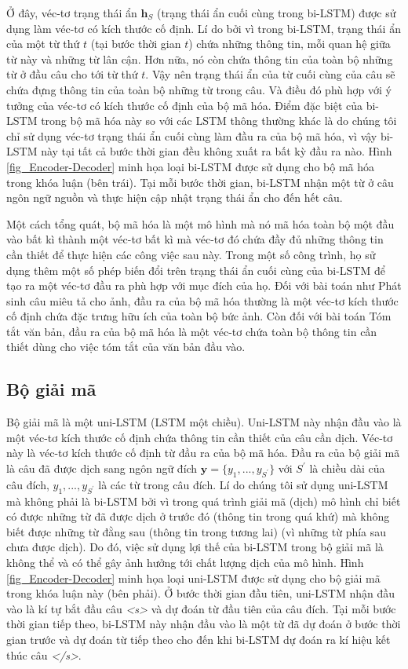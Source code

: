 Ở đây, véc-tơ trạng thái ẩn $\bm{h}_S$ (trạng thái ẩn cuối cùng trong bi-LSTM) được sử dụng làm véc-tơ có kích thước cố định. Lí do bởi vì trong bi-LSTM, trạng thái ẩn của một từ thứ $t$ (tại bước thời gian $t$) chứa những thông tin, mỗi quan hệ giữa từ này và những từ lân cận. Hơn nữa, nó còn chứa thông tin của toàn bộ những từ ở đầu câu cho tới từ thứ $t$. Vậy nên trạng thái ẩn của từ cuối cùng của câu sẽ chứa đựng thông tin của toàn bộ những từ trong câu. Và điều đó phù hợp với ý tưởng của véc-tơ có kích thước cố định của bộ mã hóa. Điểm đặc biệt của bi-LSTM trong bộ mã hóa này so với các LSTM thông thường khác là do chúng tôi chỉ sử dụng véc-tơ trạng thái ẩn cuối cùng làm đầu ra của bộ mã hóa, vì vậy bi-LSTM này tại tất cả bước thời gian đều không xuất ra bất kỳ đầu ra nào. Hình \ref{fig_Encoder-Decoder} minh họa loại bi-LSTM được sử dụng cho bộ mã hóa trong khóa luận (bên trái). Tại mỗi bước thời gian, bi-LSTM nhận một từ ở câu ngôn ngữ nguồn và thực hiện cập nhật trạng thái ẩn cho đến hết câu.

Một cách tổng quát, bộ mã hóa là một mô hình mà nó mã hóa toàn bộ một đầu vào bất kì thành một véc-tơ bất kì mà véc-tơ đó chứa đầy đủ những thông tin cần thiết để thực hiện các công việc sau này. Trong một số công trình, họ sử dụng thêm một số phép biến đổi trên trạng thái ẩn cuối cùng của bi-LSTM để tạo ra một véc-tơ đầu ra phù hợp với mục đích của họ. Đối với bài toán như Phát sinh câu miêu tả cho ảnh, đầu ra của bộ mã hóa thường là một véc-tơ kích thước cố định chứa đặc trưng hữu ích của toàn bộ bức ảnh. Còn đối với bài toán Tóm tắt văn bản, đầu ra của bộ mã hóa là một véc-tơ chứa toàn bộ thông tin cần thiết dùng cho việc tóm tắt của văn bản đầu vào.

\subsection{Bộ giải mã}
Bộ giải mã là một uni-LSTM (LSTM một chiều). Uni-LSTM này nhận đầu vào là một véc-tơ kích thước cố định chứa thông tin cần thiết của câu cần dịch. Véc-tơ này là véc-tơ kích thước cố định từ đầu ra của bộ mã hóa. Đầu ra của bộ giải mã là câu đã được dịch sang ngôn ngữ đích $\bm{y} = \{y_1, ..., y_{S^{'}}\}$ với $S^{'}$ là chiều dài của câu đích, $y_1, ...,y_{S^{'}}$ là các từ trong câu đích.
Lí do chúng tôi sử dụng uni-LSTM mà không phải là bi-LSTM bởi vì trong quá trình giải mã (dịch) mô hình chỉ biết có được những từ đã được dịch ở trước đó (thông tin trong quá khứ) mà không biết được những từ đằng sau (thông tin trong tương lai) (vì những từ phía sau chưa được dịch). Do đó, việc sử dụng lợi thế của bi-LSTM trong bộ giải mã là không thể và có thể gây ảnh hưởng tới chất lượng dịch của mô hình. Hình \ref{fig_Encoder-Decoder} minh họa loại uni-LSTM được sử dụng cho bộ giải mã trong khóa luận này (bên phải). Ở bước thời gian đầu tiên, uni-LSTM nhận đầu vào là kí tự bắt đầu câu \textit{<s>} và dự đoán từ đầu tiên của câu đích. Tại mỗi bước thời gian tiếp theo, bi-LSTM này nhận đầu vào là một từ đã dự đoán ở bước thời gian trước và dự đoán từ tiếp theo cho đến khi bi-LSTM dự đoán ra kí hiệu kết thúc câu \textit{</s>}.


